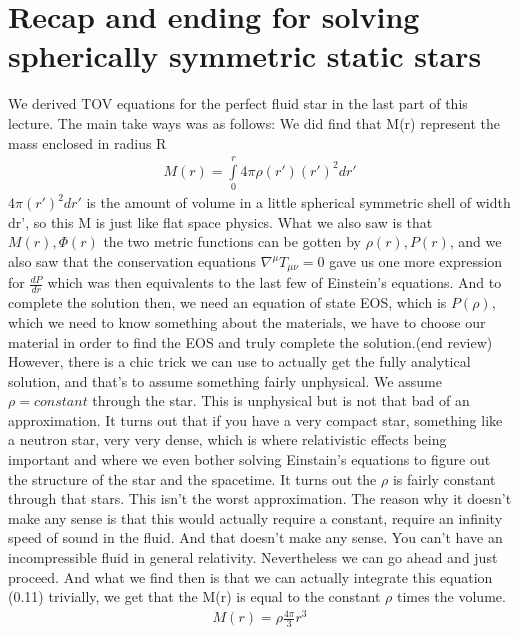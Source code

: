 \documentclass[10pt]{article}
\begin{document}
\part{Recap and ending for solving spherically symmetric static stars}
We derived TOV equations for the perfect fluid star in the last part of this lecture. The main take ways was as follows:
\newline \newline
We did find that M(r) represent the mass enclosed in radius R 
\begin{align} M(r)=\int\limits^r_0 4\pi\rho(r')(r')^2 dr'\end{align}
$4\pi(r')^2 dr'$ is the amount of volume in a little spherical symmetric shell of width dr', so this M is just like flat space physics.
What we also saw is that $M(r),\Phi(r)$ the two metric functions can be gotten by $\rho(r),P(r)$, and we also saw that the conservation equations $\nabla^\mu T_{\mu\nu}=0$ gave us one more expression for $\frac{dP}{dr}$ which was then equivalents to the last few of Einstein's equations.
And to complete the solution then, we need an equation of state EOS, which is $P(\rho)$, which we need to know something about the materials, we have to choose our material in order to find the EOS and truly complete the solution.(end review)
\newline\newline
However, there is a chic trick we can use to actually get the fully analytical solution, and that's to assume something fairly unphysical. We assume $\rho=constant$ through the star. This is unphysical but is not that bad of an approximation. It turns out that if you have a very compact star, something like a neutron star, very very dense, which is where relativistic effects being important and where we even bother solving Einstain's equations to figure out the structure of the star and the spacetime. It turns out the $\rho$ is fairly constant through that stars. This isn't the worst approximation. The reason why it doesn't make any sense is that this would actually require a constant, require an infinity speed of sound in the fluid. And that doesn't make any sense. You can't have an incompressible fluid in general relativity. Nevertheless we can go ahead and just proceed. And what we find then is that we can actually integrate this equation (0.11) trivially, we get that the M(r) is equal to the constant $\rho$ times the volume.
\begin{align}M(r)=\rho \frac{4\pi}{3} r^3\end{align}
\end{document}
